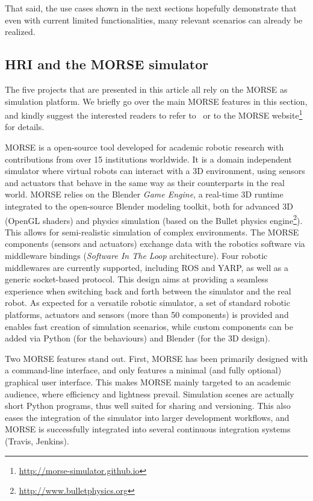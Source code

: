 \documentclass[conference]{IEEEtran}
\begin{document}
That said, the use cases shown in the next sections hopefully demonstrate that
even with current limited functionalities, many relevant scenarios can already
be realized.


\subsection*{HRI and the MORSE simulator}

The five projects that are presented in this article all rely on the MORSE as
simulation platform. We briefly go over the main MORSE features in this section,
and kindly suggest the interested readers to refer to~\cite{morse_simpar_2012}
or to the MORSE website\footnote{\url{http://morse-simulator.github.io}} for
details.

MORSE is a open-source tool developed for academic robotic research with
contributions from over 15 institutions worldwide. It is a domain independent
simulator where virtual robots can interact with a 3D environment, using sensors
and actuators that behave in the same way as their counterparts in the real
world. MORSE relies on the Blender \emph{Game Engine}, a real-time 3D runtime
integrated to the open-source Blender modeling toolkit, both for advanced 3D
(OpenGL shaders) and physics simulation (based on the {\sc Bullet} physics
engine\footnote{\url{http://www.bulletphysics.org}}). This allows for semi-realistic simulation of complex environments.
The MORSE components (sensors and actuators) exchange data with the robotics
software via middleware bindings (\emph{Software In The Loop} architecture).
Four robotic middlewares are currently supported, including ROS and YARP, as
well as a generic socket-based protocol. This design aims at providing a
seamless experience when switching back and forth between the simulator and the
real robot. As expected for a versatile robotic simulator, a set of standard
robotic platforms, actuators and sensors (more than 50 components) is
provided and enables fast creation of simulation scenarios, while custom
components can be added via Python (for the behaviours) and Blender (for the 3D
design).

Two MORSE features stand out. First, MORSE has been primarily designed with a
command-line interface, and only features a minimal (and fully optional)
graphical user interface. This makes MORSE mainly targeted to an academic
audience, where efficiency and lightness prevail.  Simulation scenes are
actually short Python programs, thus well suited for sharing and versioning.
This also eases the integration of the simulator into larger development
workflows, and MORSE is successfully integrated into several continuous
integration systems (Travis, Jenkins).
\end{document}
